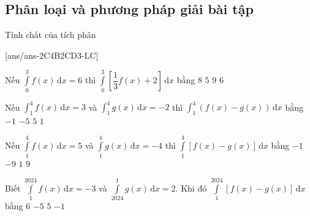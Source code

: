 \subsection{Phân loại và phương pháp giải bài tập}
\setcounter{dang}{0}
\begin{dang}{Tính chất của tích phân}

\end{dang}
\setcounter{ex}{0}
\TN
{}[ans/ans-2C4B2CD3-LC]
\begin{ex}%
	Nếu $\displaystyle\int\limits_0^3f(x)\mathrm{\,d}x=6$ thì $\displaystyle\int\limits_0^3\left[\dfrac{1}{3}f(x)+2\right]\mathrm{\,d}x$ bằng
	\choice
	{\True $8$}
	{$5$}
	{$9$}
	{$6$}
\end{ex}
\begin{ex}%
	Nếu $\displaystyle\int_1^4 f(x) \mathrm{\,d}x=3$ và $\displaystyle\int_1^4 g(x) \mathrm{\,d}x=-2$ thì $\displaystyle\int_1^4\left(f(x)-g(x)\right)\mathrm{\,d}x$ bằng
	\choice
	{$-1$}
	{$-5$}
	{\True $5$}
	{$1$}
\end{ex}
\begin{ex}%
	Nếu $\displaystyle\int\limits_1^4f(x)\mathrm{\,d}x=5$ và $\displaystyle\int\limits_1^4g(x)\mathrm{\,d}x=-4$ thì $\displaystyle\int\limits_1^4\left[f(x)-g(x)\right]\mathrm{\,d}x$ bằng
	\choice
	{$-1$}
	{$-9$}
	{$1$}
	{\True $9$}
\end{ex}
\begin{ex}%
	Biết $\displaystyle\int\limits_1^{2024}f(x)\mathrm{\,d}x=-3$ và $\displaystyle\int\limits_{2024}^1g(x)\mathrm{\,d}x=2$. Khi đó $\displaystyle\int\limits_1^{2024}\left[f(x)-g(x)\right]\mathrm{\,d}x$ bằng
	\choice
	{$6$}
	{$-5$}
	{$5$}
	{\True $-1$}
\end{ex}
